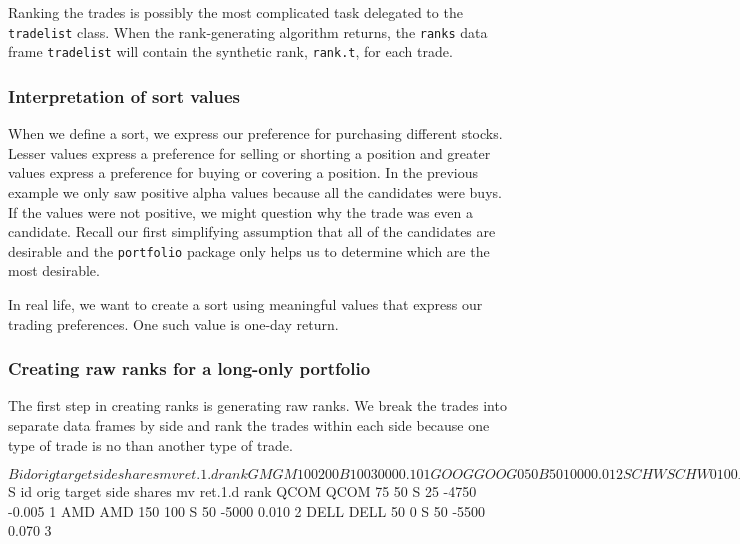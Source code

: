 \documentclass{article}
\begin{document}
Ranking the trades is possibly the most complicated task delegated to
the \texttt{tradelist} class.  When the rank-generating algorithm
returns, the \texttt{ranks} data frame \texttt{tradelist} will contain
the synthetic rank, \texttt{rank.t}, for each trade.

\subsubsection{Interpretation of sort values}

When we define a sort, we express our preference for purchasing
different stocks.  Lesser values express a preference for selling or
shorting a position and greater values express a preference for buying
or covering a position.  In the previous example we only saw positive
alpha values because all the candidates were buys.  If the values were
not positive, we might question why the trade was even a candidate.
Recall our first simplifying assumption that all of the can\-di\-dates
are de\-sir\-able and the \texttt{portfolio} package only helps us to
determine which are the most desirable.

In real life, we want to create a sort using meaningful values that
express our trading preferences.  One such value is one-day return.

\subsubsection{Creating raw ranks for a long-only portfolio}
\label{Creating raw ranks for a long-only portfolio}

The first step in creating ranks is generating raw ranks.  We break
the trades into separate data frames by side and rank the trades
within each side because one type of trade is no than another type
of trade.  

\begin{Schunk}
\begin{Soutput}
$B
       id orig target side shares   mv ret.1.d rank
GM     GM  100    200    B    100 3000    0.10    1
GOOG GOOG    0     50    B     50 1000    0.01    2
SCHW SCHW    0    100    B    100 5000   -0.01    3
MSFT MSFT    0    100    B    100 6000   -0.02    4

$S
       id orig target side shares    mv ret.1.d rank
QCOM QCOM   75     50    S     25 -4750  -0.005    1
AMD   AMD  150    100    S     50 -5000   0.010    2
DELL DELL   50      0    S     50 -5500   0.070    3
\end{Soutput}
\end{Schunk}
\end{document}
